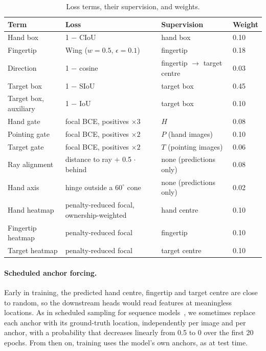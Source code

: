 \begin{table}[h]
  \caption{Loss terms, their supervision, and weights.}
  \label{tab:weights}
  \footnotesize
  \begin{tabular}{llll}
    \toprule
    Term & Loss & Supervision & Weight \\
    \midrule
    Hand box & 1 $-$ CIoU & hand box & 0.10 \\
    Fingertip & Wing ($w{=}0.5$, $\epsilon{=}0.1$) & fingertip & 0.18 \\
    Direction & 1 $-$ cosine & fingertip $\to$ target centre & 0.03 \\
    Target box & 1 $-$ SIoU & target box & 0.45 \\
    Target box, auxiliary & 1 $-$ IoU & target box & 0.10 \\
    Hand gate & focal BCE, positives $\times3$ & $H$ & 0.08 \\
    Pointing gate & focal BCE, positives $\times2$ & $P$ (hand images) & 0.10 \\
    Target gate & focal BCE, positives $\times2$ & $T$ (pointing images) & 0.06 \\
    Ray alignment & distance to ray $+$ 0.5 $\cdot$ behind & none (predictions only) & 0.08 \\
    Hand axis & hinge outside a $60^\circ$ cone & none (predictions only) & 0.02 \\
    Hand heatmap & penalty-reduced focal, ownership-weighted & hand centre & 0.10 \\
    Fingertip heatmap & penalty-reduced focal & fingertip & 0.10 \\
    Target heatmap & penalty-reduced focal & target centre & 0.10 \\
    \bottomrule
  \end{tabular}
\end{table}

\paragraph{Scheduled anchor forcing.} Early in training, the predicted hand centre, fingertip and target centre are close to random, so the downstream heads would read features at meaningless locations. As in scheduled sampling for sequence models~\cite{bengio2015scheduled}, we sometimes replace each anchor with its ground-truth location, independently per image and per anchor, with a probability that decreases linearly from 0.5 to 0 over the first 20 epochs. From then on, training uses the model's own anchors, as at test time.

